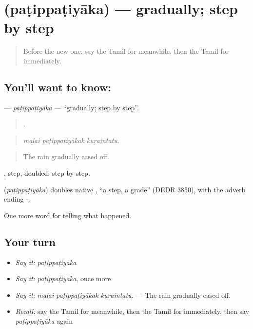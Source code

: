 \section[\texorpdfstring{\ta{படிப்படியாக} (paṭippaṭiyāka)}{படிப்படியாக (paṭippaṭiyāka)}]{ (paṭippaṭiyāka) — gradually; step by step}

\label{lesson:TA-C313-patippatiyaka}



\begin{quote}
Before the new one: say the Tamil for meanwhile, then the Tamil for immediately.
\end{quote}

\subsection*{You'll want to know: }
\textbf{} — \emph{paṭippaṭiyāka} — \textquotedblleft{}gradually; step by step\textquotedblright{}.

\begin{quote}
  .
\end{quote}

\begin{quote}
\emph{maḻai paṭippaṭiyākak kuṟaintatu.}
\end{quote}

\begin{quote}
The rain gradually eased off.
\end{quote}

, step, doubled: step by step.

\begin{cousinweb}
\textbf{} (\emph{paṭippaṭiyāka}) doubles native , \textquotedblleft{}a step, a grade\textquotedblright{} (DEDR 3850), with the adverb ending -.
\end{cousinweb}

\begin{grammarlens}[title={What you've built}]
One more word for telling what happened.
\end{grammarlens}

\subsection*{Your turn}
\begin{itemize}
\raggedright
  \item \emph{Say it:} \emph{paṭippaṭiyāka}
  \item \emph{Say it:} \emph{paṭippaṭiyāka}, once more
  \item \emph{Say it:} \emph{maḻai paṭippaṭiyākak kuṟaintatu.} — The rain gradually eased off.
  \item \emph{Recall:} say the Tamil for meanwhile, then the Tamil for immediately, then say \emph{paṭippaṭiyāka} again
\end{itemize}

